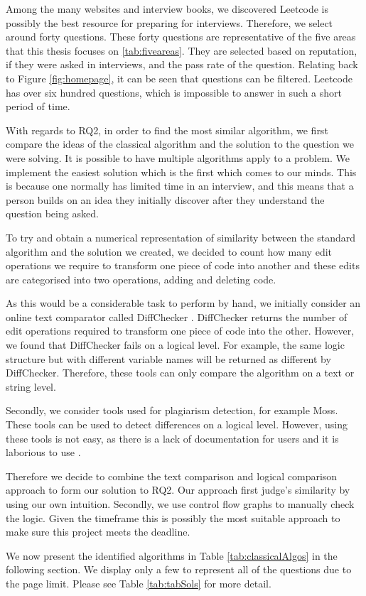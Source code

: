 \documentclass[10pt,twocolumn,hidelinks]{IEEEtran}
\begin{document}
\par Among the many websites and interview books, we discovered Leetcode is possibly the best resource for preparing for interviews. Therefore, we select around forty questions. These forty questions are representative of the five areas that this thesis focuses on \ref{tab:fiveareas}. They are selected based on reputation, if they were asked in interviews, and the pass rate of the question. Relating back to Figure \ref{fig:homepage}, it can be seen that questions can be filtered. Leetcode has over six hundred questions, which is impossible to answer in such a short period of time.
\par With regards to RQ2, in order to find the most similar algorithm, we first compare the ideas of the classical algorithm and the solution to the question we were solving. It is possible to have multiple algorithms apply to a problem. We implement the easiest solution which is the first which comes to our minds. This is because one normally has limited time in an interview, and this means that a person builds on an idea they initially discover after they understand the question being asked.
\par To try and obtain a numerical representation of similarity between the standard algorithm and the solution we created, we decided to count how many edit operations we require to transform one piece of code into another and these edits are categorised into two operations, adding and deleting code.
\par As this would be a considerable task to perform by hand, we initially consider an online text comparator called DiffChecker \cite{diff}. DiffChecker returns the number of edit operations required to transform one piece of code into the other. However, we found that DiffChecker fails on a logical level. For example, the same logic structure but with different variable names will be returned as different by DiffChecker. Therefore, these tools can only compare the algorithm on a text or string level. 
\par Secondly, we consider tools used for plagiarism detection, for example Moss. These tools can be used to detect differences on a logical level. However, using these tools is not easy, as there is a lack of documentation for users and it is laborious to use \cite{mosswebsite}. 
\par Therefore we decide to combine the text comparison and logical comparison approach to form our solution to RQ2. Our approach first judge's similarity by using our own intuition. Secondly, we use control flow graphs to manually check the logic. Given the timeframe this is possibly the most suitable approach to make sure this project meets the deadline. 
\par We now present the identified algorithms in Table \ref{tab:classicalAlgos} in the following section. We display only a few to represent all of the questions due to the page limit. Please see Table \ref{tab:tabSols} for more detail.
\end{document}
